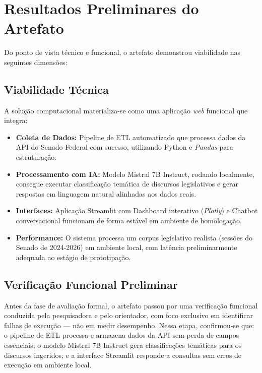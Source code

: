 \section{Resultados Preliminares do Artefato}

Do ponto de vista técnico e funcional, o artefato demonstrou viabilidade nas seguintes dimensões:

\subsection{Viabilidade Técnica}

A solução computacional materializa-se como uma aplicação \textit{web} funcional que integra:

\begin{itemize}
    \item \textbf{Coleta de Dados:} Pipeline de ETL automatizado que processa dados da API do Senado Federal com sucesso, utilizando Python e \textit{Pandas} para estruturação.

    \item \textbf{Processamento com IA:} Modelo Mistral 7B Instruct, rodando localmente, consegue executar classificação temática de discursos legislativos e gerar respostas em linguagem natural alinhadas aos dados reais.

    \item \textbf{Interfaces:} Aplicação Streamlit com Dashboard interativo (\textit{Plotly}) e Chatbot conversacional funcionam de forma estável em ambiente de homologação.

    \item \textbf{Performance:} O sistema processa um corpus legislativo realista (sessões do Senado de 2024-2026) em ambiente local, com latência preliminarmente adequada ao estágio de prototipação.
\end{itemize}

\subsection{Verificação Funcional Preliminar}

Antes da fase de avaliação formal, o artefato passou por uma verificação funcional conduzida pela pesquisadora e pelo orientador, com foco exclusivo em identificar falhas de execução — não em medir desempenho. Nessa etapa, confirmou-se que: o pipeline de ETL processa e armazena dados da API sem perda de campos essenciais; o modelo Mistral 7B Instruct gera classificações temáticas para os discursos ingeridos; e a interface Streamlit responde a consultas sem erros de execução em ambiente local.

